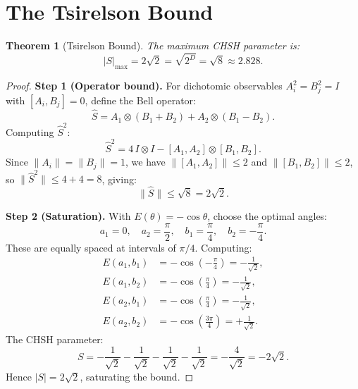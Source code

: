 \documentclass[12pt,a4paper]{article}
\newtheorem{theorem}{Theorem}[section]
\theoremstyle{definition}
\theoremstyle{remark}
\begin{document}
\section{The Tsirelson Bound}
\label{sec:tsirelson}

\begin{theorem}[Tsirelson Bound]
\label{thm:tsirelson}
The maximum CHSH parameter is:
\begin{equation}
  \boxed{|S|_{\max} = 2\sqrt{2} = \sqrt{2^D} = \sqrt{8}
  \approx 2.828.}
\end{equation}
\end{theorem}

\begin{proof}
\textbf{Step 1 (Operator bound).}
For dichotomic observables $A_i^2 = B_j^2 = I$ with
$[A_i, B_j] = 0$, define the Bell operator:
\begin{equation}
  \hat{S} = A_1 \otimes (B_1 + B_2)
  + A_2 \otimes (B_1 - B_2).
\end{equation}
Computing $\hat{S}^2$:
\begin{equation}
  \hat{S}^2 = 4\,I \otimes I
  - [A_1, A_2] \otimes [B_1, B_2].
\end{equation}
Since $\|A_i\| = \|B_j\| = 1$, we have
$\|[A_1, A_2]\| \leq 2$ and $\|[B_1, B_2]\| \leq 2$, so
$\|\hat{S}^2\| \leq 4 + 4 = 8$, giving:
\begin{equation}
  \|\hat{S}\| \leq \sqrt{8} = 2\sqrt{2}.
\end{equation}

\textbf{Step 2 (Saturation).}
With $E(\theta) = -\cos\theta$, choose the optimal angles:
\begin{equation}
  a_1 = 0,\quad a_2 = \frac{\pi}{2},\quad
  b_1 = \frac{\pi}{4},\quad b_2 = -\frac{\pi}{4}.
\end{equation}
These are equally spaced at intervals of $\pi/4$.  Computing:
\begin{align}
  E(a_1, b_1) &= -\cos\!\left(-\frac{\pi}{4}\right)
  = -\frac{1}{\sqrt{2}}, \\
  E(a_1, b_2) &= -\cos\!\left(\frac{\pi}{4}\right)
  = -\frac{1}{\sqrt{2}}, \\
  E(a_2, b_1) &= -\cos\!\left(\frac{\pi}{4}\right)
  = -\frac{1}{\sqrt{2}}, \\
  E(a_2, b_2) &= -\cos\!\left(\frac{3\pi}{4}\right)
  = +\frac{1}{\sqrt{2}}.
\end{align}
The CHSH parameter:
\begin{equation}
  S = -\frac{1}{\sqrt{2}} - \frac{1}{\sqrt{2}}
  - \frac{1}{\sqrt{2}} - \frac{1}{\sqrt{2}}
  = -\frac{4}{\sqrt{2}} = -2\sqrt{2}.
\end{equation}
Hence $|S| = 2\sqrt{2}$, saturating the bound.
\end{proof}
\end{document}
